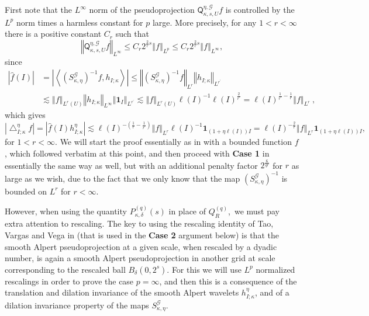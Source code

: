 \documentclass{amsart}%
\theoremstyle{plain}
\numberwithin{equation}{section}
\begin{document}
First note that the $L^{\infty}$ norm of the pseudoprojection $\mathsf{Q}%
_{\kappa,s,U}^{\eta,\mathcal{G}}f$ is controlled by the $L^{p}$ norm times a
harmless constant for $p$ large. More precisely, for any $1<r<\infty$ there is
a positive constant $C_{r}$ such that%
\begin{equation}
\left\Vert \mathsf{Q}_{\kappa,s,U}^{\eta,\mathcal{G}}f\right\Vert _{L^{\infty
}}\leq C_{r}2^{\frac{2}{r}s}\left\Vert f\right\Vert _{L^{p}}\leq C_{r}%
2^{\frac{2}{r}s}\left\Vert f\right\Vert _{L^{\infty}},\label{penalty}%
\end{equation}
since%
\begin{align*}
\left\vert \widehat{f}\left(  I\right)  \right\vert  &  =\left\vert
\left\langle \left(  S_{\kappa,\eta}^{\mathcal{G}}\right)  ^{-1}f,h_{I;\kappa
}\right\rangle \right\vert \leq\left\Vert \left(  S_{\kappa,\eta}%
^{\mathcal{G}}\right)  ^{-1}f\right\Vert _{L^{r}}\left\Vert h_{I;\kappa
}\right\Vert _{L^{r^{\prime}}}\\
&  \lesssim\left\Vert f\right\Vert _{L^{r}\left(  U\right)  }\left\Vert
h_{I;\kappa}\right\Vert _{L^{\infty}}\left\Vert \mathbf{1}_{I}\right\Vert
_{L^{r^{\prime}}}\lesssim\left\Vert f\right\Vert _{L^{r}\left(  U\right)
}\ell\left(  I\right)  ^{-1}\ell\left(  I\right)  ^{\frac{2}{r^{\prime}}}%
=\ell\left(  I\right)  ^{\frac{1}{r^{\prime}}-\frac{1}{r}}\left\Vert
f\right\Vert _{L^{r}}\ ,
\end{align*}
which gives%
\[
\left\vert \bigtriangleup_{I;\kappa}^{\eta}f\right\vert =\left\vert
\widehat{f}\left(  I\right)  h_{I;\kappa}^{\eta}\right\vert \lesssim
\ell\left(  I\right)  ^{-\left(  \frac{1}{r}-\frac{1}{r^{\prime}}\right)
}\left\Vert f\right\Vert _{L^{r}}\ell\left(  I\right)  ^{-1}\mathbf{1}%
_{\left(  1+\eta\ell\left(  I\right)  \right)  I}=\ell\left(  I\right)
^{-\frac{2}{r}}\left\Vert f\right\Vert _{L^{r}}\mathbf{1}_{\left(  1+\eta
\ell\left(  I\right)  \right)  I},
\]
for $1<r<\infty$. We will start the proof essentially as in \cite[proof of
Theorem 3]{RiSa} with a bounded function $f$, which followed \cite[Section
2]{BoGu} verbatim at this point, and then proceed with \textbf{Case 1} in
essentially the same way as well, but with an additional penalty factor
$2^{\frac{6}{qr}}$ for $r$ as large as we wish, due to the fact that we only
know that the map $\left(  S_{\kappa,\eta}^{\mathcal{G}}\right)  ^{-1}$ is
bounded on $L^{r}$ for $r<\infty$.

However, when using the quantity $P_{\kappa,\delta}^{\left(  q\right)
}\left(  s\right)  $ in place of $Q_{R}^{\left(  q\right)  }$,\ we must pay
extra attention to rescaling. The key to using the rescaling identity of Tao,
Vargas and Vega in \cite{TaVaVe} (that is used in the \textbf{Case 2} argument
below) is that the smooth Alpert pseudoprojection at a given scale, when
rescaled by a dyadic number, is again a smooth Alpert pseudoprojection in
another grid at scale corresponding to the rescaled ball $B_{\delta}\left(
0,2^{s}\right)  $. For this we will use $L^{p}$ normalized rescalings in order
to prove the case $p=\infty$, and then this is a consequence of the
translation and dilation invariance of the smooth Alpert wavelets
$h_{I;\kappa}^{\eta}$, and of a dilation invariance property of the maps
$S_{\kappa,\eta}^{\mathcal{G}}$.
\end{document}
